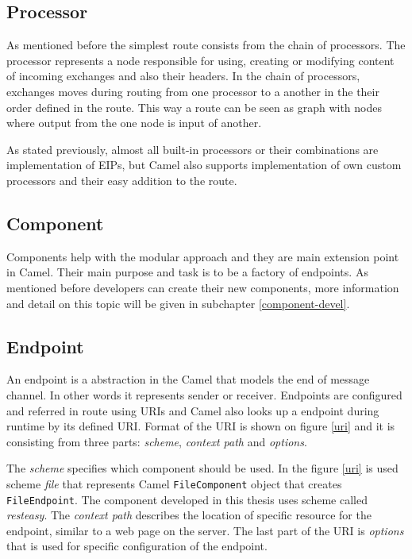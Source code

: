 \documentclass[12pt,final,oneside]{fithesis2}
\begin{document}
\subsection*{Processor}
As mentioned before the simplest route consists from the chain of processors. The processor represents a node responsible for using, creating or modifying content of incoming exchanges and also their headers. In the chain of processors, exchanges moves during routing from one processor to a another in the their order defined in the route. This way a route can be seen as graph with nodes where output from the one node is input of another.

As stated previously, almost all built-in processors or their combinations are implementation of EIPs, but Camel also supports implementation of own custom processors and their easy addition to the route.

\subsection*{Component}
Components help with the modular approach and they are main extension point in Camel. Their main purpose and task is to be a factory of endpoints. As mentioned before developers can create their new components, more information and detail on this topic will be given in subchapter \ref{component-devel}. 

\subsection*{Endpoint}
An endpoint is a abstraction in the Camel that models the end of message channel. In other words it represents sender or receiver. Endpoints are configured and referred in route using URIs and Camel also looks up a endpoint during runtime by its defined URI. Format of the URI is shown on figure \ref{uri} and it is consisting from three parts: \textit{scheme}, \textit{context path} and \textit{options}. 

The \textit{scheme} specifies which component should be used. In the figure \ref{uri} is used scheme \textit{file} that represents Camel \texttt{FileComponent} object that creates \texttt{FileEndpoint}. The component developed in this thesis uses scheme called \textit{resteasy}. The \textit{context path} describes the location of specific resource for the endpoint, similar to a web page on the server. The last part of the URI is \textit{options} that is used for specific configuration of the endpoint.
\end{document}
